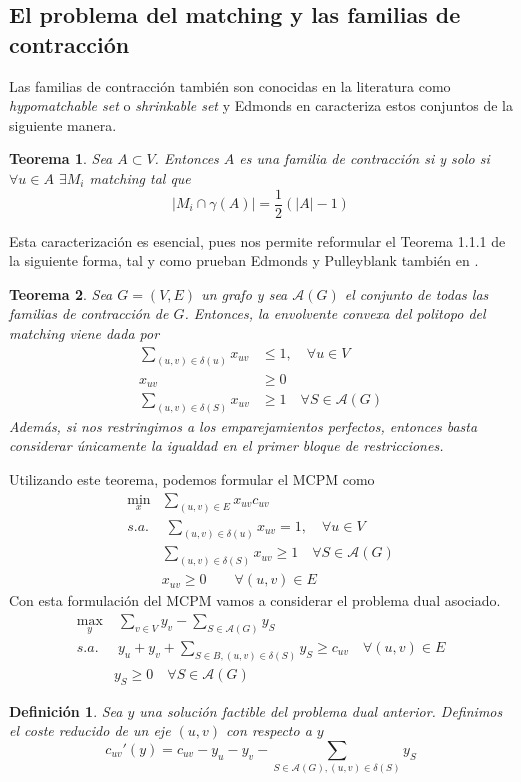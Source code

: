 \documentclass[twoside,a4paper,openright,12pt]{book}
\newtheorem{defi}{Definici\'on}[section]
\newtheorem{thm}{Teorema}[section]
\begin{document}
\subsection{El problema del matching y las familias de contracción}
Las familias de contracción también son conocidas en la literatura como \textit{hypomatchable set} o \textit{shrinkable set} y Edmonds en \cite{edmon3} caracteriza estos conjuntos de la siguiente manera.
\begin{thm}
Sea $A \subset V$. Entonces $A$ es una familia de contracción si y solo si $\forall u \in A$ $\exists M_i$ matching tal que 
$$
|M_i\cap \gamma(A)| = \frac{1}{2}(|A|-1)
$$
\end{thm}
Esta caracterización es esencial, pues nos permite reformular el Teorema 1.1.1 de la siguiente forma, tal y como prueban Edmonds y Pulleyblank también en \cite{edmon3}.
\begin{thm}
Sea $G=(V,E)$ un grafo y sea $\mathcal{A}(G)$ el conjunto de todas las familias de contracción de $G$. Entonces, la envolvente convexa del politopo del matching viene dada por
\begin{align*}
\sum_{(u,v)\in\delta(u)} x_{uv} &\leq 1, \quad \forall u\in V\\
x_{uv} &\geq 0\\
\sum_{(u,v)\in \delta(S)} x_{uv}& \geq 1 \quad \forall S \in \mathcal{A}(G)	
\end{align*}
Además, si nos restringimos a los emparejamientos perfectos, entonces basta considerar únicamente la igualdad en el primer bloque de restricciones.
\end{thm}
Utilizando este teorema, podemos formular el MCPM como
\begin{align*}
\min_x & \sum_{(u,v) \in E}x_{uv}c_{uv}\\
s.a.&\;\sum_{(u,v)\in\delta(u)} x_{uv} =	 1, \quad \forall u \in V\\
&\sum_{(u,v)\in \delta(S)} x_{uv} \geq 1\quad \forall S \in \mathcal{A}(G)	\\
&x_{uv} \geq 0 \qquad \forall(u,v)\in E
\end{align*}
Con esta formulación del MCPM vamos a considerar el problema dual asociado.
\begin{align*}
\max_{y} &\; \sum_{v\in V} y_v - \sum_{S\in \mathcal{A}(G)} y_S\\
s.a.&\;y_u+y_v + \sum_{S\in B,(u,v)\in \delta(S)}y_S  \geq c_{uv} \quad \forall (u,v)\in E\\
&y_S\geq 0 \quad \forall S\in \mathcal{A}(G)
\end{align*}
\begin{defi}
Sea $y$ una solución factible del problema dual anterior. Definimos el coste reducido de un eje $(u,v)$ con respecto a $y$
$$
c_{uv}'(y) = c_{uv} - y_u -y_v - \sum_{S\in \mathcal{A}(G),(u,v)\in \delta(S)} y_S
$$ 

\end{defi}
\end{document}

